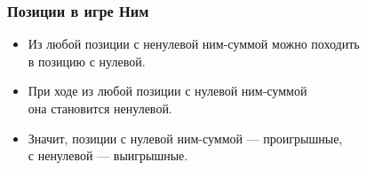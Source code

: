 \begin{frame} \frametitle{Позиции в игре Ним}
\begin{itemize} \itemsep=5mm
	\item Из любой позиции с ненулевой ним-суммой можно походить \\
	в позицию с нулевой.
	\item При ходе из любой позиции с нулевой ним-суммой \\
	она становится ненулевой.
	\item Значит, позиции с нулевой ним-суммой — проигрышные, \\
	с ненулевой — выигрышные.
\end{itemize}
\end{frame}
